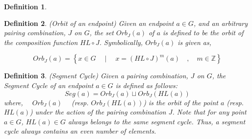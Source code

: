\documentclass{article}
\newtheorem{definition}{Definition}[section]
\newtheorem{remark}{Remark}[section]
\begin{document}
\begin{definition}

\label{def_pc}
\end{definition}



\begin{definition}(Orbit of an endpoint)
 Given an  endpoint $ a \in G$, and an arbitrary pairing combination, $J$ on $G$, the set $Orb_J(a)$ of $a$ is defined to be the orbit of the composition function $HL \circ J$. Symbolically, $Orb_J(a)$ is given as,

$$ Orb_J(a) = \left\{ x \in G \quad \mid \quad x = (HL\circ J)^{m}(a) \quad , \quad m \in \mathbb{Z}\right\}$$
\label{def_orbit}
\end{definition}

\begin{definition}(Segment Cycle)
Given a pairing combination, $J$ on $G$, the Segment Cycle of an endpoint $a \in G $ is  defined as follows:
$$Seg(a)=Orb_J(a) \sqcup Orb_J(HL(a))$$
where, $\quad Orb_J(a) \quad$ (resp. $Orb_J(HL(a))$) is the orbit of the point $a$ (resp. $HL(a)$) under the action of the pairing combination $J$. Note that for any point $a \in G$, $HL(a)\in G$ always belongs to the same segment cycle. Thus, a segment cycle always contains an even number of elements.

\label{def_seg_cyc}
\end{definition}
\end{document}
